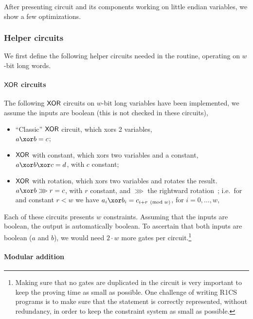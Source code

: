After presenting  circuit and its components working on little endian variables, we show a few optimizations.

\subsubsection{Helper circuits}\label{implementation:efficiency:blake:helper-circuits}
We first define the following helper circuits needed in the  routine, operating on $w$-bit long words.

\paragraph{$\mathsf{XOR}$ circuits}

The following $\mathsf{XOR}$ circuits on $w$-bit long variables have been implemented, we assume the inputs are boolean (this is not checked in these circuits),
\begin{itemize}
  \item ``Classic'' $\mathsf{XOR}$ circuit, which xors 2 variables,\\ $a \xor b = c$;
  \item $\mathsf{XOR}$ with constant, which xors two variables and a constant,\\ $a \xor b \xor c = d$, with $c$ constant;
  \item $\mathsf{XOR}$ with rotation, which xors two variables and rotates the result.\\
  $a \xor b \ggg r = c$, with $r$ constant, and $\ggg$ the rightward rotation~\cite[Section 2.3]{blakecompietf};
  i.e.~for and constant $r < w$ we have $a_i \xor b_i = c_{i+r \pmod w}$, for $i = 0, \ldots, w$,
\end{itemize}

Each of these circuits presents $w$ constraints. Assuming that the inputs are boolean, the output is automatically boolean. To ascertain that both inputs are boolean ($a$ and $b$), we would need $2\cdot w$ more gates per circuit.\footnote{Making sure that no gates are duplicated in the circuit is very important to keep the proving time as small as possible. One challenge of writing R1CS programs is to make sure that the statement is correctly represented, without redundancy, in order to keep the constraint system as small as possible.}


\paragraph{Modular addition}\label{implementation:efficiency:blake:helper-circuits:modular-addition}

